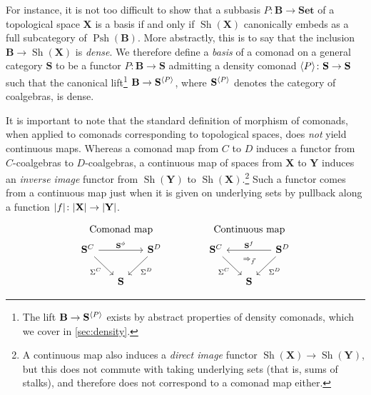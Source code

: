 \documentclass[11pt, oneside, article]{memoir}
\theoremstyle{plain}
\theoremstyle{definition}
\theoremstyle{remark}
\DeclareMathOperator{\Sh}{Sh}
\DeclareMathOperator{\Psh}{Psh}
\DeclarePairedDelimiter{\gen}{\langle}{\rangle}
\DeclarePairedDelimiter{\abs}{\lvert}{\rvert}
\newcommand{\namedcat}[1]{\mathbf{#1}}
\newcommand{\cat}[1]{\mathbf{#1}}
\newcommand{\spa}[1]{\mathbf{#1}}
\newcommand{\Set}{\namedcat{Set}}
\newcommand{\CoalgOn}[2]{{#2}^{#1}}
\newcommand{\CoalgS}[1]{\CoalgOn{#1}{\bS}}
\newcommand{\pts}[1]{{\abs{#1}}}
\newcommand{\one}[1]{\pts{#1}}
\newcommand{\carr}{\Sigma}
\newcommand{\car}[1]{\carr^{#1}}
\newcommand{\carC}{\car{\cC}}
\newcommand{\carD}{\car{\cD}}
\newcommand{\ph}[1]{#1}
\newcommand{\com}[2]{{#1}^{#2}}
\newcommand{\con}[2]{{#1}^{#2}}
\newcommand{\connat}[1]{\vec{#1}}
\newcommand{\Ps}[1]{\Psh(#1)}
\newcommand{\cmnd}[1]{{#1}}
\newcommand{\cC}{\cmnd{C}}
\newcommand{\cD}{\cmnd{D}}
\newcommand{\bB}{\cat{B}}
\newcommand{\bS}{\cat{S}}
\newcommand{\pP}{\ph{P}}
\newcommand{\cP}{\gen{\pP}}
\newcommand{\tX}{\spa{X}}
\newcommand{\tY}{\spa{Y}}
\newcommand{\CS}{\CoalgS{\cC}}
\newcommand{\DS}{\CoalgS{\cD}}
\newcommand{\PS}{\CoalgS{\cP}}
\begin{document}
For instance, it is not too difficult to show that a subbasis
$\pP \colon \bB \to \Set$ of a topological space $\tX$ is a basis if
and only if $\Sh(\tX)$ canonically embeds as a full subcategory of
$\Ps{\bB}$.  More abstractly, this is to say that the inclusion
$\bB \to \Sh(\tX)$ is \emph{dense}.  We therefore define a
\emph{basis} of a comonad on a general category $\bS$ to be a functor
$\pP \colon \bB \to \bS$ admitting a density comonad
$\cP\colon\bS\to\bS$ such that the canonical lift\footnote{The lift
  $\bB \to \PS$ exists by abstract properties of density comonads,
  which we cover in \cref{sec:density}.} $\bB \to \PS$, where $\PS$
denotes the category of coalgebras, is dense.

It is important to note that the standard definition of morphism of
comonads, when applied to comonads corresponding to topological spaces,
does \emph{not} yield continuous maps.
Whereas a comonad map from $\cC$ to $\cD$ induces a functor from
$\cC$-coalgebras to $\cD$-coalgebras, a continuous map of spaces from
$\tX$ to $\tY$ induces an \emph{inverse image} functor from $\Sh(\tY)$
to $\Sh(\tX)$.\footnote{A continuous map also induces a \emph{direct
    image} functor $\Sh(\tX) \to \Sh(\tY)$, but this does not commute
  with taking underlying sets (that is, sums of stalks), and therefore
  does not correspond to a comonad map either.}  Such a functor comes
from a continuous map just when it is given on underlying sets by
pullback along a function $\one{f} \colon \pts{\tX} \to \pts{\tY}$.

\[
  \overset{\raise.5em\hbox{\normalsize Comonad map}}{
    \begin{tikzcd}[column sep=15pt,ampersand replacement=\&]
      \CS \&\& \DS \\
      \& \bS
      \arrow["{\com{\bS}{\phi}}", from=1-1, to=1-3]
      \arrow["\carC"', from=1-1, to=2-2]
      \arrow["\carD", from=1-3, to=2-2]
    \end{tikzcd}
  }
  \qquad\qquad
  \overset{\raise.5em\hbox{\normalsize Continuous map}}{
    \begin{tikzcd}[column sep=15pt,ampersand replacement=\&]
      \CS \&\& \DS \\
      \& \bS
      \arrow["{\con{\bS}{f}}"', from=1-3, to=1-1]
      \arrow["\carC"', ""{name=0, anchor=center, inner sep=0}, from=1-1, to=2-2]
      \arrow["\carD", ""{name=1, anchor=center, inner sep=0}, from=1-3, to=2-2]
      \arrow["\Rightarrow_{\connat{f}}", shift right=10pt, draw=none, from=1, to=0]
    \end{tikzcd}
  }
\]
\end{document}
